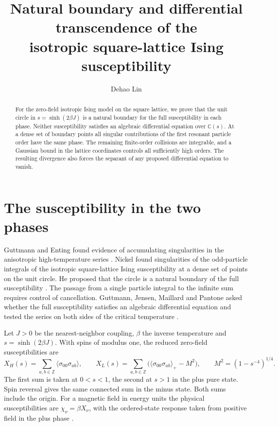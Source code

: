 \documentclass[11pt]{article}
\title{Natural boundary and differential transcendence of the\\
isotropic square-lattice Ising susceptibility}
\author{Dehao Lin}\date{}
\newcommand{\C}{\mathbb C}
\newcommand{\Z}{\mathbb Z}
\begin{document}
\maketitle
\begin{abstract}
For the zero-field isotropic Ising model on the square lattice, we prove
that the unit circle in $s=\sinh(2\beta J)$ is a natural boundary for the
full susceptibility in each phase. Neither susceptibility satisfies an algebraic
differential equation over $\C(s)$. At a dense set of boundary points
all singular contributions of the first resonant particle order have
the same phase.
The remaining finite-order collisions are integrable, and a Gaussian
bound in the lattice coordinates controls all sufficiently high orders.
The resulting divergence
also forces the separant of any proposed differential equation to vanish.
\end{abstract}

\section{The susceptibility in the two phases}

Guttmann and Enting found evidence of accumulating singularities in the
anisotropic high-temperature series \cite{GE}.
Nickel found singularities of the odd-particle integrals of the
isotropic square-lattice Ising susceptibility at a dense set of points
on the unit circle. He proposed that the circle is a natural boundary
of the full susceptibility \cite{Nickel}. The passage from a single
particle integral to the infinite sum requires control of cancellation.
Guttmann, Jensen, Maillard and Pantone asked whether the full
susceptibility satisfies an algebraic differential equation and tested
the series on both sides of the critical temperature \cite[Sec.~6]{GJMP}.

Let $J>0$ be the nearest-neighbor coupling, $\beta$ the inverse
temperature and $s=\sinh(2\beta J)$. With spins of modulus one, the
reduced zero-field susceptibilities are
\[
 X_H(s)=\sum_{a,b\in\Z}\langle\sigma_{00}\sigma_{ab}\rangle,\qquad
 X_L(s)=\sum_{a,b\in\Z}
 \bigl(\langle\sigma_{00}\sigma_{ab}\rangle_+-M^2\bigr),
 \qquad M^2=(1-s^{-4})^{1/4}.
\]
The first sum is taken at $0<s<1$, the second at $s>1$ in the plus
pure state. Spin reversal gives the same connected sum in the minus
state. Both sums include the origin. For a magnetic field in energy
units the physical susceptibilities are $\chi_\nu=\beta X_\nu$,
with the ordered-state response taken from positive field in the
plus phase \cite[(1.7)--(1.10)]{ONGP}.
\end{document}
